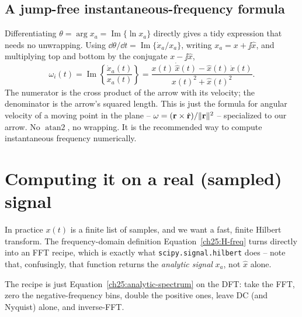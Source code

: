 \subsection{A jump-free instantaneous-frequency formula}
\label{ch25:ifreq-formula}

Differentiating $\theta=\arg x_a = \operatorname{Im}\{\ln x_a\}$ directly gives a tidy
expression that needs no unwrapping. Using $\dd\theta/\dd t=\operatorname{Im}\{\dot
x_a/x_a\}$, writing $x_a = x + \jj\hat x$, and multiplying top and bottom by the conjugate $x - \jj\hat x$,
\begin{equation}
\label{ch25:ifreq-clean}
\omega_i(t)
 = \operatorname{Im}\!\left\{\frac{\dot x_a(t)}{x_a(t)}\right\}
 = \frac{x(t)\,\dot{\hat{x}}(t) - \hat{x}(t)\,\dot{x}(t)}
        {x(t)^2 + \hat{x}(t)^2}.
\end{equation}
The numerator is the cross product of the arrow with its velocity; the denominator is the
arrow's squared length. This is just the formula for angular velocity of a moving point in
the plane -- $\omega = (\mathbf{r} \times \dot{\mathbf{r}})/\lVert\mathbf{r}\rVert^2$ -- specialized to our
arrow. No $\operatorname{atan2}$, no wrapping. It is the recommended way to compute
instantaneous frequency numerically.

\section{Computing it on a real (sampled) signal}
\label{ch25:compute}

In practice $x(t)$ is a finite list of samples, and we want a fast, finite Hilbert
transform. The frequency-domain definition Equation~\eqref{ch25:H-freq} turns directly
into an FFT recipe, which is exactly what \texttt{scipy.signal.hilbert} does -- note that,
confusingly, that function returns the \emph{analytic signal} $x_a$, not $\hat x$ alone.

The recipe is just Equation~\eqref{ch25:analytic-spectrum} on the DFT: take the FFT,
zero the negative-frequency bins, double the positive ones, leave DC (and Nyquist) alone,
and inverse-FFT.


